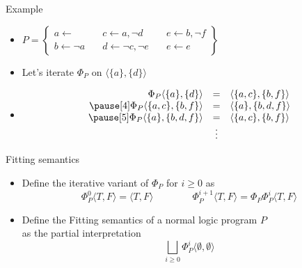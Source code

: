 \begin{frame}{Example}
  \bigskip
  \begin{itemize}
  \item<1->
    \(
    P
    =
    \left\{
      \begin{array}{lll}
        a \leftarrow                \quad &
        c \leftarrow a, \neg d      \quad &
        e \leftarrow b, \neg f
        \\
        b \leftarrow \neg a         \quad &
        d \leftarrow \neg c, \neg e \quad &
        e \leftarrow e
      \end{array}
    \right\}
    \)
    \bigskip
  \item<2-> Let's iterate $\Phi_P$ on $\langle \{a\}, \{d\}\rangle$
  \item<3-> []
    \[
    \begin{array}{rcl}
    \Phi_P\langle\{a  \},\{  d  \}\rangle &=&\langle\{a,c\},\{b,f  \}\rangle
    \\\pause[4]
    \Phi_P\langle\{a,c\},\{b,  f\}\rangle &=&\langle\{a  \},\{b,d,f\}\rangle
    \\\pause[5]
    \Phi_P\langle\{a  \},\{b,d,f\}\rangle &=&\langle\{a,c\},\{b,f  \}\rangle
    \\
    & \vdots &
    \end{array}
    \]
  \end{itemize}
\end{frame}
\begin{frame}{Fitting semantics}
  \bigskip
  \begin{itemize}
  \item<2-> Define the iterative variant of $\Phi_P$ for $i\geq 0$ as
    \[
      \Phi_P^0\langle T, F \rangle = \langle T, F \rangle
      \qquad\qquad
      \Phi_P^{i+1}\langle T, F \rangle =
      \Phi_P\Phi_P^i\langle T, F \rangle
    \]
  \item<3-> Define the \alert{Fitting semantics} of a normal logic program $P$\\
    as the partial interpretation
    \[
      \textstyle{\bigsqcup_{i \geq 0}} \Phi_P^i \langle \emptyset, \emptyset \rangle
    \]
  \end{itemize}
\nocite{fitting85a}
\end{frame}
